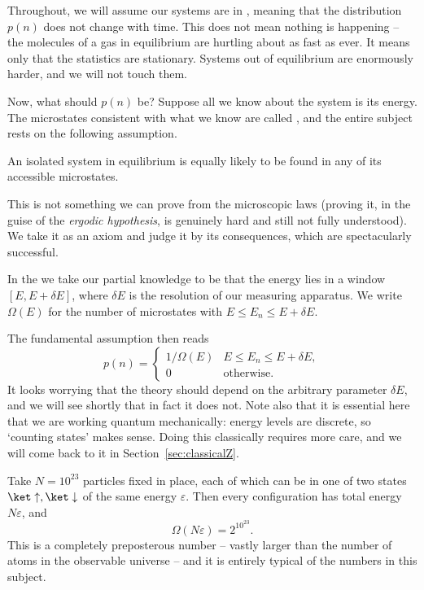 Throughout, we will assume our systems are in , meaning that the distribution $p(n)$ does not change with time. This does not mean nothing is happening -- the molecules of a gas in equilibrium are hurtling about as fast as ever. It means only that the statistics are stationary. Systems out of equilibrium are enormously harder, and we will not touch them.

Now, what should $p(n)$ be? Suppose all we know about the system is its energy. The microstates consistent with what we know are called , and the entire subject rests on the following assumption.

\begin{axiom}
	An isolated system in equilibrium is equally likely to be found in any of its accessible microstates.
\end{axiom}

This is not something we can prove from the microscopic laws (proving it, in the guise of the \emph{ergodic hypothesis}, is genuinely hard and still not fully understood). We take it as an axiom and judge it by its consequences, which are spectacularly successful.

\begin{definition}
	In the  we take our partial knowledge to be that the energy lies in a window $[E, E + \delta E]$, where $\delta E$ is the resolution of our measuring apparatus. We write $\Omega(E)$ for the number of microstates with $E \leq E_n \leq E + \delta E$.
\end{definition}

The fundamental assumption then reads
$$
p(n) = \begin{cases}
	1/\Omega(E) & E \leq E_n \leq E + \delta E,\\
	0 & \text{otherwise.}
\end{cases}
$$
It looks worrying that the theory should depend on the arbitrary parameter $\delta E$, and we will see shortly that in fact it does not. Note also that it is essential here that we are working quantum mechanically: energy levels are discrete, so `counting states' makes sense. Doing this classically requires more care, and we will come back to it in Section~\ref{sec:classicalZ}.

\begin{example}
	Take $N = 10^{23}$ particles fixed in place, each of which can be in one of two states $\ket\uparrow, \ket\downarrow$ of the same energy $\varepsilon$. Then every configuration has total energy $N \varepsilon$, and
	$$
	\Omega(N\varepsilon) = 2^{10^{23}}.
	$$
	This is a completely preposterous number -- vastly larger than the number of atoms in the observable universe -- and it is entirely typical of the numbers in this subject.
\end{example}

